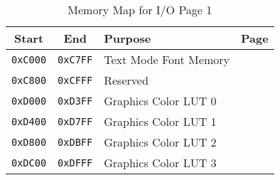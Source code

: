 \begin{table}[ht]
    \begin{center}
        \begin{tabular}{|c|c|l|l|} \hline
            Start & End & Purpose & Page \\ \hline\hline
            \verb+0xC000+ & \verb+0xC7FF+ & Text Mode Font Memory & \pageref{sec:text_font} \\ \hline
            \verb+0xC800+ & \verb+0xCFFF+ & Reserved & \\ \hline
            \verb+0xD000+ & \verb+0xD3FF+ & Graphics Color LUT 0 & \multirow{4}{*}{\pageref{tab:graph_cluts}} \\ \cline{1-3}
            \verb+0xD400+ & \verb+0xD7FF+ & Graphics Color LUT 1 & \\ \cline{1-3}
            \verb+0xD800+ & \verb+0xDBFF+ & Graphics Color LUT 2 & \\ \cline{1-3}
            \verb+0xDC00+ & \verb+0xDFFF+ & Graphics Color LUT 3 & \\ \hline
        \end{tabular}
    \end{center}
    \caption{Memory Map for I/O Page 1}
    \label{tab:map_io_1}
\end{table}
